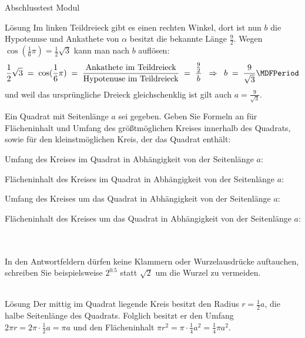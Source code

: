 \begin{MTest}{Abschlusstest Modul }
\begin{MExercise}
\begin{MHint}{L\"osung}
Im linken Teildreieck gibt es einen rechten Winkel, dort ist nun $b$ die Hypotenuse und Ankathete von $\alpha$ besitzt die bekannte L\"ange $\frac{9}{2}$. Wegen $\cos(\frac16\pi)=\frac12\sqrt3$ kann man
nach $b$ aufl\"osen:
$$
\frac12\sqrt3 \;=\; \cos(\frac16\pi) \;=\; \frac{\text{Ankathete im Teildreieck}}{\text{Hypotenuse im Teildreieck}} \;=\; \frac{\frac92}{b} \;\; \Rightarrow\;\;
b \;=\; \frac{9}{\sqrt3} \MDFPeriod
$$
und weil das urspr\"ungliche Dreieck gleichschenklig ist gilt auch $a=\frac{9}{\sqrt3}$.
\end{MHint}

\end{MExercise}



\begin{MExercise}
Ein Quadrat mit Seitenl\"ange $a$ sei gegeben. Geben Sie Formeln an f\"ur Fl\"acheninhalt und Umfang des gr\"o\ss tm\"oglichen Kreises innerhalb des Quadrats, sowie f\"ur
den kleinstm\"oglichen Kreis, der das Quadrat enth\"alt:
\begin{MExerciseItems}
\item{Umfang des Kreises im Quadrat in Abh\"angigkeit von der Seitenl\"ange $a$: }
\item{Fl\"acheninhalt des Kreises im Quadrat in Abh\"angigkeit von der Seitenl\"ange $a$: }
\item{Umfang des Kreises um das Quadrat in Abh\"angigkeit von der Seitenl\"ange $a$: }
\item{Fl\"acheninhalt des Kreises um das Quadrat in Abh\"angigkeit von der Seitenl\"ange $a$: }
\end{MExerciseItems}
\ \\ \ \\
In den Antwortfeldern d\"urfen keine Klammern oder Wurzelausdr\"ucke auftauchen, schreiben Sie beispielsweise $2^{0.5}$ statt $\sqrt{2}$ um die Wurzel zu vermeiden.
\ \\ \ \\
\begin{MHint}{L\"osung}
Der mittig im Quadrat liegende Kreis besitzt den Radius $r=\frac12a$, die halbe Seitenl\"ange des Quadrats. Folglich besitzt er den Umfang $2\pi r =2\pi \cdot \frac12a = \pi a$ und den Fl\"acheninhalt
$\pi r^2=\pi \cdot \frac14a^2 =\frac14\pi a^2$.\\

\end{MHint}
\end{MExercise}
\end{MTest}
